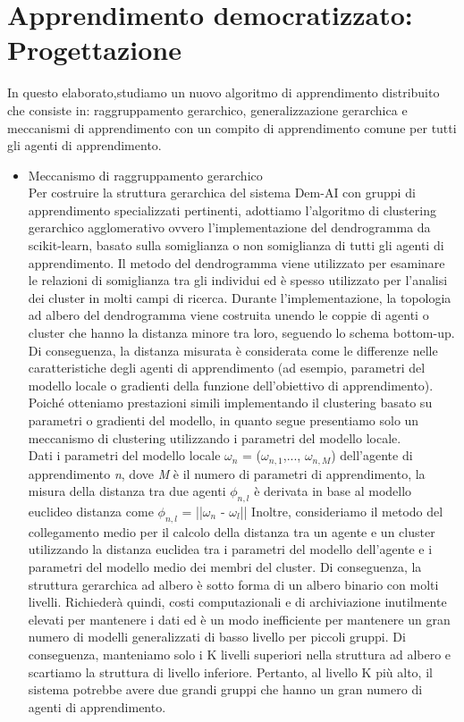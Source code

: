 \chapter{Apprendimento democratizzato: Progettazione}\label{ch:chapter3}
In questo elaborato,studiamo un nuovo algoritmo di apprendimento distribuito che consiste in: raggruppamento gerarchico, generalizzazione gerarchica e meccanismi di apprendimento con un compito di apprendimento comune per tutti gli agenti di apprendimento.

\begin{itemize}

\item Meccanismo di raggruppamento gerarchico\\

Per costruire la struttura gerarchica del sistema Dem-AI con gruppi di apprendimento specializzati pertinenti, adottiamo l'algoritmo di clustering gerarchico agglomerativo ovvero l'implementazione del dendrogramma da scikit-learn, basato sulla somiglianza o non somiglianza di tutti gli agenti di apprendimento.
Il metodo del dendrogramma viene utilizzato per esaminare le relazioni di somiglianza tra gli individui ed è spesso utilizzato per l'analisi dei cluster in molti campi di ricerca. Durante l'implementazione, la topologia ad albero del dendrogramma viene costruita unendo le coppie di agenti o cluster che hanno la distanza minore tra loro, seguendo lo schema bottom-up. Di conseguenza, la distanza misurata è considerata come le differenze nelle caratteristiche degli agenti di apprendimento (ad esempio, parametri del modello locale o gradienti della funzione dell'obiettivo di apprendimento). Poiché otteniamo prestazioni simili implementando il clustering basato su parametri o gradienti del modello, in quanto segue presentiamo solo un meccanismo di clustering utilizzando i parametri del modello locale. \\
Dati i parametri del modello locale $\omega_n$ = ($\omega_{n,1}$,..., $\omega_{n,M}$) dell'agente di apprendimento \textsl{n}, dove \textsl{M} è il numero di parametri di apprendimento, la misura della distanza tra due agenti $\phi_{n,l}$ è derivata in base al modello euclideo distanza come $\phi_{n,l}$ =  ||$\omega_n$ - $\omega_l$|| 
Inoltre, consideriamo il metodo del collegamento medio per il calcolo della distanza tra un agente e un cluster utilizzando la distanza euclidea tra i parametri del modello dell'agente e i parametri del modello medio dei membri del cluster.
Di conseguenza, la struttura gerarchica ad albero è sotto forma di un albero binario con molti livelli. Richiederà quindi, costi computazionali e di archiviazione inutilmente elevati per mantenere i dati ed è un modo inefficiente per mantenere un gran numero di modelli generalizzati di basso livello per piccoli gruppi. Di conseguenza, manteniamo solo i K livelli superiori nella struttura ad albero e scartiamo la struttura di livello inferiore. Pertanto, al livello K più alto, il sistema potrebbe avere due grandi gruppi che hanno un gran numero di agenti di apprendimento.



\end{itemize}
